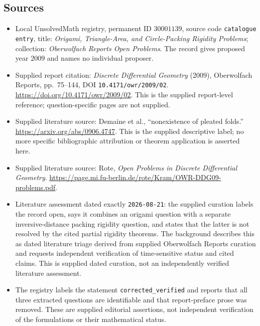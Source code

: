 \documentclass[11pt]{article}
\begin{document}
\subsection{Sources}
\begin{itemize}
\item Local UnsolvedMath registry, permanent ID \(30001139\), source code \texttt{catalogue entry}, title: \emph{Origami, Triangle-Area, and Circle-Packing Rigidity Problems}; collection: \emph{Oberwolfach Reports Open Problems}. The record gives proposed year \(2009\) and names no individual proposer.
\item Supplied report citation: \emph{Discrete Differential Geometry} (2009), Oberwolfach Reports, pp.~75--144, DOI \texttt{10.4171/owr/2009/02}. \url{https://doi.org/10.4171/owr/2009/02}. This is the supplied report-level reference; question-specific pages are not supplied.
\item Supplied literature source: Demaine et al., ``nonexistence of pleated folds.'' \url{https://arxiv.org/abs/0906.4747}. This is the supplied descriptive label; no more specific bibliographic attribution or theorem application is asserted here.
\item Supplied literature source: Rote, \emph{Open Problems in Discrete Differential Geometry}. \url{https://page.mi.fu-berlin.de/rote/Kram/OWR-DDG09-problems.pdf}.
\item Literature assessment dated exactly \texttt{2026-08-21}: the supplied curation labels the record open, says it combines an origami question with a separate inversive-distance packing rigidity question, and states that the latter is not resolved by the cited partial rigidity theorems. The background describes this as dated literature triage derived from supplied Oberwolfach Reports curation and requests independent verification of time-sensitive status and cited claims. This is supplied dated curation, not an independently verified literature assessment.
\item The registry labels the statement \texttt{corrected\_verified} and reports that all three extracted questions are identifiable and that report-preface prose was removed. These are supplied editorial assertions, not independent verification of the formulations or their mathematical status.
\end{itemize}
\end{document}
